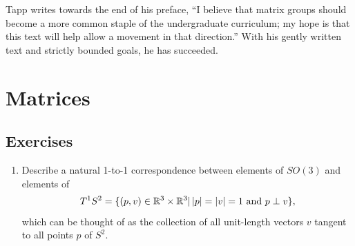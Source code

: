 \documentclass{article}
\begin{document}
Tapp writes towards the end of his preface, ``I believe that matrix groups should become a more common staple of the undergraduate curriculum; my hope is that this text will help allow a movement in that direction.'' With his gently written text and strictly bounded goals, he has succeeded.

\section{Matrices}
\subsection*{Exercises}

\begin{enumerate}
\item Describe a natural 1-to-1 correspondence between elements of $SO(3)$ and elements of 
  $$T^{1}S^{2} = \{(p,v)\in\mathbb{R}^{3}\times\mathbb{R}^{3}|\,|p|=|v|=1 \textnormal{ and } p\perp v\},$$
  which can be thought of as the collection of all unit-length vectors $v$ tangent to all points $p$ of $S^{2}$.
\end{enumerate}

  
\end{document}
